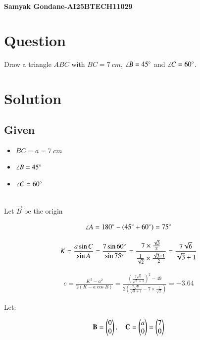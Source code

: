 \documentclass{article}
\begin{document}
\begin{center}
\large
    \textbf{Samyak Gondane-AI25BTECH11029}
\end{center}
\date{}

\section*{Question}
Draw a triangle $ABC$ with $BC = 7\ cm$, $\angle B = 45\degree$ and $\angle C = 60\degree$.

\section*{Solution}


\subsection*{Given}
\begin{itemize}
    \item $BC = a = 7\ cm$
    \item $\angle B = 45\degree$
    \item $\angle C = 60\degree$
\end{itemize}
\\
Let $\vec{B}$ be the origin

\begin{align}
\angle A = 180\degree - (45\degree + 60\degree) = 75\degree
\end{align}

\begin{align}
K = \frac{a \sin C}{\sin A}
= \frac{7 \sin 60\degree}{\sin 75\degree}
= \frac{7 \times \frac{\sqrt{3}}{2}}{\frac{1}{\sqrt{2}} \times \frac{\sqrt{3} + 1}{2}}
= \frac{7 \sqrt{6}}{\sqrt{3} + 1}
\end{align}





\begin{align}
c = \frac{K^2 - a^2}{2(K - a \cos B)}
= \frac{(\frac{7 \sqrt{6}}{\sqrt{3} + 1})^2 - 49}{2( \frac{7 \sqrt{6}}{\sqrt{3} + 1} - 7 \times \frac{1}{\sqrt{2}})} = -3.64
\end{align}



Let:


\begin{align}
\mathbf{B} = \begin{pmatrix}0 \\ 0\end{pmatrix}, \quad
\mathbf{C} = \begin{pmatrix}a \\ 0\end{pmatrix} = \begin{pmatrix}7 \\ 0\end{pmatrix}
\end{align}
\end{document}

